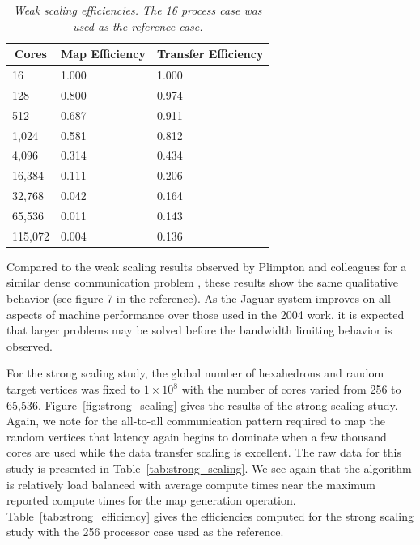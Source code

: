\documentclass{mc2013}
\begin{document}
\begin{table}[htpb!]
  \begin{center}
    \begin{tabular}{lll}\hline\hline
      \multicolumn{1}{c}{Cores}& \multicolumn{1}{c}{Map Efficiency} &
      \multicolumn{1}{c}{Transfer Efficiency}\\\hline\hline 16 & 1.000
      & 1.000 \\ 128 & 0.800 & 0.974 \\ 512 & 0.687 & 0.911 \\ 1,024 &
      0.581 & 0.812 \\ 4,096 & 0.314 & 0.434 \\ 16,384 & 0.111 & 0.206
      \\ 32,768 & 0.042 & 0.164 \\ 65,536 & 0.011 & 0.143 \\ 115,072 &
      0.004 & 0.136 \\ \hline\hline
    \end{tabular}
  \end{center}
  \caption{\sl Weak scaling efficiencies. The 16 process case was used
    as the reference case.}
  \label{tab:weak_efficiency}
\end{table}

Compared to the weak scaling results observed by Plimpton and
colleagues for a similar dense communication problem
\cite{Plimpton_2004}, these results show the same qualitative behavior
(see figure 7 in the reference). As the Jaguar system improves on all
aspects of machine performance over those used in the 2004 work, it is
expected that larger problems may be solved before the bandwidth
limiting behavior is observed.

\label{subsec:strong_scaling}
For the strong scaling study, the global number of hexahedrons and
random target vertices was fixed to $1 \times 10^8$ with the number
of cores varied from 256 to 65,536. Figure~\ref{fig:strong_scaling}
gives the results of the strong scaling study. Again, we note for the
all-to-all communication pattern required to map the random vertices
that latency again begins to dominate when a few thousand cores are
used while the data transfer scaling is excellent. The raw data for
this study is presented in Table~\ref{tab:strong_scaling}. We see
again that the algorithm is relatively load balanced with average
compute times near the maximum reported compute times for the map
generation operation. Table~\ref{tab:strong_efficiency} gives the
efficiencies computed for the strong scaling study with the 256
processor case used as the reference.
\end{document}
